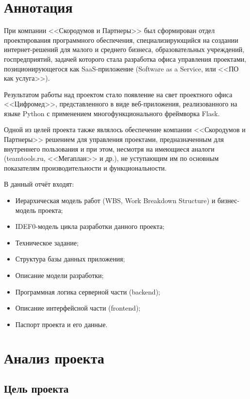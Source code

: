 \documentclass[a4paper, 14pt]{extarticle}
\begin{document}

\newpage


\tableofcontents
\newpage


\section{Аннотация}
При компании <<Скородумов и Партнеры>> был сформирован отдел проектирования программного обеспечения, специализирующийся на создании интернет-решений для малого и среднего бизнеса, образовательных учреждений, госпредприятий, задачей которого стала разработка офиса управления проектами, позиционирующегося как SaaS-приложение (Software as a Service, или <<ПО как услуга>>).

Результатом работы над проектом стало появление на свет проектного офиса <<Цифромед>>, представленного в виде веб-приложения, реализованного на языке Python с применением многофункционального фреймворка Flask.

Одной из целей проекта также являлось обеспечение компании <<Скородумов и Партнеры>> решением для управления проектами, предназначенным для внутреннего пользования и при этом, несмотря на имеющиеся аналоги (teamtools.ru, <<Мегаплан>> и др.), не уступающим им по основным показателям производительности и функциональности.


В данный отчёт входят:

\begin{itemize}
\setlength{\itemsep}{-1mm}
\item Иерархическая модель работ (WBS, Work Breakdown Structure) и бизнес-модель проекта;
\item IDEF0-модель цикла разработки данного проекта;
\item Техническое задание;
\item Структура базы данных приложения;
\item Описание модели разработки;
\item Программная логика серверной части (backend);
\item Описание интерфейсной части (frontend);
\item Паспорт проекта и его данные.
\end{itemize}

\newpage


\section{Анализ проекта}
\subsection{Цель проекта}
\end{document}
